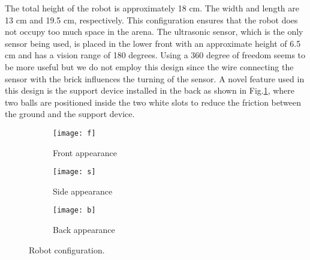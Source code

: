 The total height of the robot is approximately 18 cm. The width and length are 13 cm and 19.5 cm, respectively. This configuration ensures that the robot does not occupy too much space in the arena. The ultrasonic sensor, which is the only sensor being used, is placed in the lower front with an approximate height of 6.5 cm and has a vision range of 180 degrees. Using a 360 degree of freedom seems to be more useful but we do not employ this design since the wire connecting the sensor with the brick influences the turning of the sensor. A novel feature used in this design is the support device installed in the back as shown in Fig.\ref{fig:backrobot}, where two balls are positioned inside the two white slots to reduce the friction between the ground and the support device. 

\begin{figure}[h]
\centering
  \begin{subfigure}{0.25\textwidth}
  \texttt{[image: f]}
  \caption{Front appearance}
  \end{subfigure}
  \begin{subfigure}{0.25\textwidth}
  \texttt{[image: s]}
  \caption{Side appearance}
  \end{subfigure}
  \begin{subfigure}{0.25\textwidth}
  \texttt{[image: b]}
  \caption{Back appearance} \label{fig:backrobot}
  \end{subfigure}
  \caption{Robot configuration.}
  \label{fig:robotconfig}
\end{figure}

\FloatBarrier
